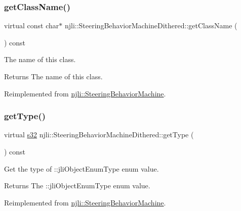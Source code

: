 \subsubsection{\texorpdfstring{get\+Class\+Name()}{getClassName()}}
{\footnotesize\ttfamily virtual const char$\ast$ njli\+::\+Steering\+Behavior\+Machine\+Dithered\+::get\+Class\+Name (\begin{DoxyParamCaption}{ }\end{DoxyParamCaption}) const\hspace{0.3cm}{\ttfamily [virtual]}}

The name of this class.

\begin{DoxyReturn}{Returns}
The name of this class. 
\end{DoxyReturn}


Reimplemented from \mbox{\hyperlink{classnjli_1_1_steering_behavior_machine_a62b8ba5c3e2b9f63eb146721c03d37a1}{njli\+::\+Steering\+Behavior\+Machine}}.

\mbox{\label{classnjli_1_1_steering_behavior_machine_dithered_a5c38478d79cba8bc3069eac4e24acc0a}} 
\subsubsection{\texorpdfstring{get\+Type()}{getType()}}
{\footnotesize\ttfamily virtual \mbox{\hyperlink{_util_8h_aa62c75d314a0d1f37f79c4b73b2292e2}{s32}} njli\+::\+Steering\+Behavior\+Machine\+Dithered\+::get\+Type (\begin{DoxyParamCaption}{ }\end{DoxyParamCaption}) const\hspace{0.3cm}{\ttfamily [virtual]}}

Get the type of \+::jli\+Object\+Enum\+Type enum value.

\begin{DoxyReturn}{Returns}
The \+::jli\+Object\+Enum\+Type enum value. 
\end{DoxyReturn}


Reimplemented from \mbox{\hyperlink{classnjli_1_1_steering_behavior_machine_a9daddfcf84380483cd2643c15d0497a4}{njli\+::\+Steering\+Behavior\+Machine}}.

